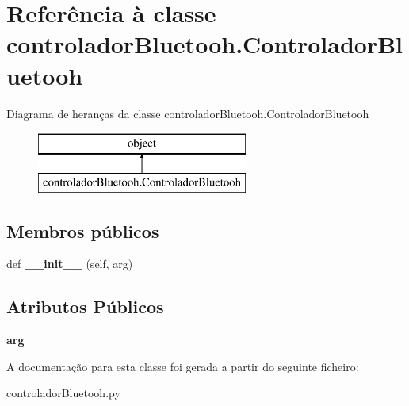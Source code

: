 \hypertarget{classcontrolador_bluetooh_1_1_controlador_bluetooh}{}\section{Referência à classe controlador\+Bluetooh.\+Controlador\+Bluetooh}
\label{classcontrolador_bluetooh_1_1_controlador_bluetooh}
Diagrama de heranças da classe controlador\+Bluetooh.\+Controlador\+Bluetooh\begin{figure}[H]
\begin{center}
\leavevmode
\includegraphics[height=2.000000cm]{classcontrolador_bluetooh_1_1_controlador_bluetooh}
\end{center}
\end{figure}
\subsection*{Membros públicos}
\begin{DoxyCompactItemize}
\item 
def {\bfseries \+\_\+\+\_\+init\+\_\+\+\_\+} (self, arg)\hypertarget{classcontrolador_bluetooh_1_1_controlador_bluetooh_a6b01f46d49cd95528274c008261fcf8d}{}\label{classcontrolador_bluetooh_1_1_controlador_bluetooh_a6b01f46d49cd95528274c008261fcf8d}

\end{DoxyCompactItemize}
\subsection*{Atributos Públicos}
\begin{DoxyCompactItemize}
\item 
{\bfseries arg}\hypertarget{classcontrolador_bluetooh_1_1_controlador_bluetooh_ac15bab8b920b372149393c33bbb6a00d}{}\label{classcontrolador_bluetooh_1_1_controlador_bluetooh_ac15bab8b920b372149393c33bbb6a00d}

\end{DoxyCompactItemize}


A documentação para esta classe foi gerada a partir do seguinte ficheiro\+:\begin{DoxyCompactItemize}
\item 
controlador\+Bluetooh.\+py\end{DoxyCompactItemize}
